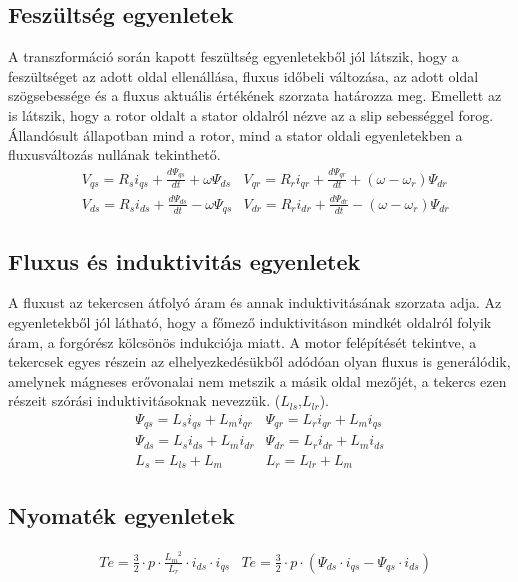 \documentclass[a4paper,12pt]{article}
\begin{document}
	\subsection{Feszültség egyenletek}
	
	A transzformáció során kapott feszültség egyenletekből jól látszik, hogy a feszültséget az adott oldal ellenállása, fluxus időbeli változása, az adott oldal szögsebessége és a fluxus aktuális értékének szorzata határozza meg. Emellett az is látszik, hogy a rotor oldalt a stator oldalról nézve az a slip sebességgel forog. Állandósult állapotban mind a rotor, mind a stator oldali egyenletekben a fluxusváltozás nullának tekinthető.
	\begin{align}
		& V_{qs} = R_{s} i_{qs} + \frac{d \Psi_{qs}}{dt} + \omega \Psi_{ds} & V_{qr} = R_{r} i_{qr} + \frac{d \Psi_{qr}}{dt} + (\omega - \omega_{r}) \Psi_{dr} \\
		& V_{ds} = R_{s} i_{ds} + \frac{d \Psi_{ds}}{dt} - \omega \Psi_{qs} & V_{dr} = R_{r} i_{dr} + \frac{d \Psi_{dr}}{dt} - (\omega - \omega_{r}) \Psi_{dr}				
	\end{align}
	
	\subsection{Fluxus és induktivitás egyenletek}
	
	A fluxust az tekercsen átfolyó áram és annak induktivitásának szorzata adja. Az egyenletekből jól látható, hogy a főmező induktivitáson mindkét oldalról folyik áram, a forgórész kölcsönös indukciója miatt. A motor felépítését tekintve, a tekercsek egyes részein az elhelyezkedésükből adódóan olyan fluxus is generálódik, amelynek mágneses erővonalai nem metszik a másik oldal mezőjét, a tekercs ezen részeit szórási induktivitásoknak nevezzük. ($L_{ls}$,$L_{lr}$).
	\begin{align}
		& \Psi_{qs} = L_{s} i_{qs} + L_{m} i_{qr} & \Psi_{qr} = L_{r} i_{qr} + L_{m} i_{qs} \\
		& \Psi_{ds} = L_{s} i_{ds} + L_{m} i_{dr} & \Psi_{dr} = L_{r} i_{dr} + L_{m} i_{ds} \\
		& L_{s} = L_{ls} + L_{m} & L_{r} = L_{lr} + L_{m} &
	\end{align}
	
	\subsection{Nyomaték egyenletek}
	
	\begin{align}
		& Te = \frac{3}{2} \cdot p \cdot \frac{{L_m}^2}{L_r} \cdot i_{ds} \cdot i_{qs}  
		& Te = \frac{3}{2} \cdot p \cdot (\Psi_{ds} \cdot i_{qs} - \Psi_{qs} \cdot i_{ds} )
	\end{align}
	
\end{document}
